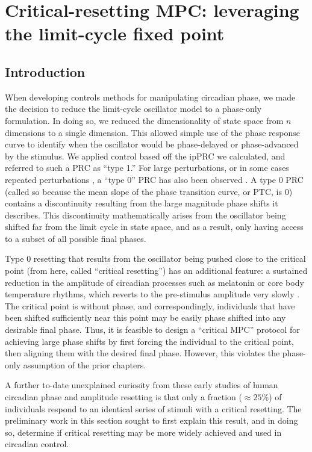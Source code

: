 \section{Critical-resetting MPC: leveraging the limit-cycle fixed point}

\subsection*{Introduction}
When developing controls methods for manipulating circadian phase, we made the decision to reduce the limit-cycle oscillator model to a phase-only formulation.
In doing so, we reduced the dimensionality of state space from $n$ dimensions to a single dimension.
This allowed simple use of the phase response curve to identify when the oscillator would be phase-delayed or phase-advanced by the stimulus.
We applied control based off the ipPRC we calculated, and referred to such a PRC as ``type 1.''
For large perturbations, or in some cases repeated perturbations \cite{Kronauer1999}, a ``type 0'' PRC has also been observed \cite{Czeisler1989}.
A type 0 PRC (called so because the mean slope of the phase transition curve, or PTC, is 0) contains a discontinuity resulting from the large magnitude phase shifts it describes.
This discontinuity mathematically arises from the oscillator being shifted far from the limit cycle in state space, and as a result, only having access to a subset of all possible final phases.

Type 0 resetting that results from the oscillator being pushed close to the critical point (from here, called ``critical resetting'') has an additional feature: a sustained reduction in the amplitude of circadian processes such as melatonin or core body temperature rhythms, which reverts to the pre-stimulus amplitude very slowly \cite{Jewett1994, Kronauer1999}.
The critical point is without phase, and correspondingly, individuals that have been shifted sufficiently near this point may be easily phase shifted into any desirable final phase.
Thus, it is feasible to design a ``critical MPC'' protocol for achieving large phase shifts by first forcing the individual to the critical point, then aligning them with the desired final phase.
However, this violates the phase-only assumption of the prior chapters.

A further to-date unexplained curiosity from these early studies of human circadian phase and amplitude resetting is that only a fraction ($\approx25$\%) of individuals respond to an identical series of stimuli with a critical resetting.
The preliminary work in this section sought to first explain this result, and in doing so, determine if critical resetting may be more widely achieved and used in circadian control. 


